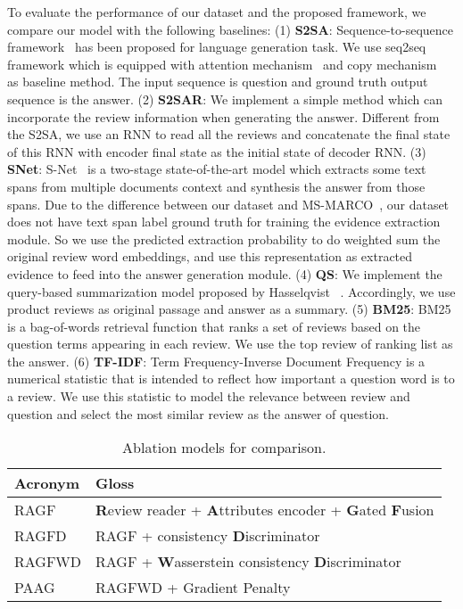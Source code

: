 To evaluate the performance of our dataset and the proposed framework, we compare our model with the following baselines:
(1) \textbf{S2SA}: Sequence-to-sequence framework~\cite{Sutskever2014SequenceTS} has been proposed for language generation task. 
We use seq2seq framework which is equipped with attention mechanism~\cite{Bahdanau2015Neural} and copy mechanism~\cite{Gu2016IncorporatingCM} as baseline method. 
The input sequence is question and ground truth output sequence is the answer.
(2) \textbf{S2SAR}: We implement a simple method which can incorporate the review information when generating the answer.
Different from the S2SA, we use an RNN to read all the reviews and concatenate the final state of this RNN with encoder final state as the initial state of decoder RNN.
(3) \textbf{SNet}: S-Net~\cite{Tan2018snet} is a two-stage state-of-the-art model which extracts some text spans from multiple documents context and synthesis the answer from those spans.
Due to the difference between our dataset and MS-MARCO~\cite{Nguyen2016MSMA}, our dataset does not have text span label ground truth for training the evidence extraction module.
So we use the predicted extraction probability to do weighted sum the original review word embeddings, and use this representation as extracted evidence to feed into the answer generation module.
(4) \textbf{QS}: We implement the query-based summarization model proposed by Hasselqvist \etal~\cite{Hasselqvist2017QueryBasedAS}. 
Accordingly, we use product reviews as original passage and answer as a summary.
(5) \textbf{BM25}: BM25 is a bag-of-words retrieval function that ranks a set of reviews based on the question terms appearing in each review.
We use the top review of ranking list as the answer.
(6) \textbf{TF-IDF}: Term Frequency-Inverse Document Frequency is a numerical statistic that is intended to reflect how important a question word is to a review.
We use this statistic to model the relevance between review and question and select the most similar review as the answer of question.

\begin{table}[t]
\centering
\caption{Ablation models for comparison.}
\label{tab:ablations}
\begin{tabular}{@{}l@{~}l}
\toprule
Acronym & Gloss \\
\midrule

RAGF &  \multicolumn{1}{p{6.5cm}}{\small \raggedright \textbf{R}eview reader + \textbf{A}ttributes encoder + \textbf{G}ated \textbf{F}usion}\\

RAGFD &  \multicolumn{1}{p{6.5cm}}{\small RAGF + consistency \textbf{D}iscriminator}\\

RAGFWD &  \multicolumn{1}{p{6.5cm}}{\small RAGF + \textbf{W}asserstein consistency \textbf{D}iscriminator}\\

PAAG &  \multicolumn{1}{p{6.5cm}}{\small RAGFWD + Gradient Penalty }\\
\bottomrule
\end{tabular}
\end{table}

